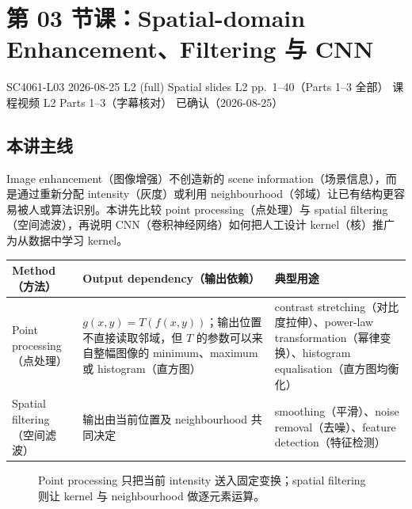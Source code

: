 
\section{第 03 节课：Spatial-domain Enhancement、Filtering 与 CNN}
\label{lecture:SC4061-L03}

\lecturemeta
  {SC4061-L03}
  {2026-08-25}
  {L2 (full) Spatial slides}
  {L2 pp.~1--40（Parts 1--3 全部）}
  {课程视频 L2 Parts 1--3（字幕核对）}
  {已确认（2026-08-25）}

\subsection{本讲主线}

Image enhancement（图像增强）不创造新的 scene information（场景信息），而是通过重新分配 intensity（灰度）或利用 neighbourhood（邻域）让已有结构更容易被人或算法识别。本讲先比较 point processing（点处理）与 spatial filtering（空间滤波），再说明 CNN（卷积神经网络）如何把人工设计 kernel（核）推广为从数据中学习 kernel。


\begin{center}
\small
\begin{tabularx}{\textwidth}{@{}>{\raggedright\arraybackslash}p{3.2cm}>{\raggedright\arraybackslash}p{4.2cm}X@{}}
  \toprule
  Method（方法） & Output dependency（输出依赖） & 典型用途 \\
  \midrule
  Point processing（点处理） & $g(x,y)=T(f(x,y))$；输出位置不直接读取邻域，但 $T$ 的参数可以来自整幅图像的 minimum、maximum 或 histogram（直方图） & contrast stretching（对比度拉伸）、power-law transformation（幂律变换）、histogram equalisation（直方图均衡化） \\
  Spatial filtering（空间滤波） & 输出由当前位置及 neighbourhood 共同决定 & smoothing（平滑）、noise removal（去噪）、feature detection（特征检测） \\
  \bottomrule
\end{tabularx}
\end{center}

\begin{figure}[htbp]
  \centering
  \resizebox{0.94\textwidth}{!}{}
  \caption{Point processing 只把当前 intensity 送入固定变换；spatial filtering 则让 kernel 与 neighbourhood 做逐元素运算。}
  \label{fig:sc4061-l03-enhancement-operators}
\end{figure}

